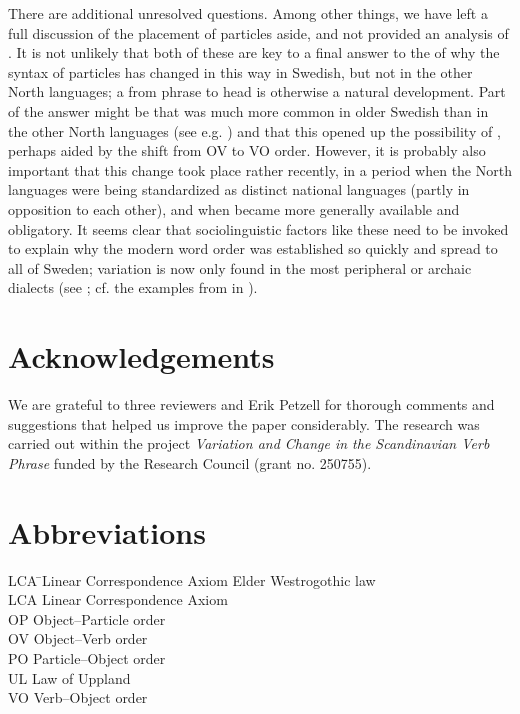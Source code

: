 \documentclass[output=paper]{langscibook}
\begin{document}
There are additional unresolved questions. Among other things, we have left a full discussion of the  placement of particles aside, and not provided an analysis of  . It is not unlikely that both of these are key to a final answer to the  of why the syntax of particles has changed in this way in Swedish, but not in the other North  languages; a  from phrase to head is otherwise a natural development. Part of the answer might be that   was much more common in older Swedish than in the other North  languages (see e.g. \citealt{Ljunggren1932}) and that this opened up the possibility of , perhaps aided by the shift from OV to VO order. However, it is probably also important that this change took place rather recently, in a period when the North  languages were being standardized as distinct national languages (partly in opposition to each other), and when  became more generally available and obligatory. It seems clear that sociolinguistic factors like these need to be invoked to explain why the modern word order was established so quickly and spread to all of Sweden; variation is now only found in the most peripheral or archaic dialects (see \citealt{Lundquist2014Active}; cf. the examples from  in ).


\section*{Acknowledgements}

We are grateful to three reviewers and Erik Petzell for thorough comments and suggestions that helped us improve the paper considerably. The research was carried out within the project \textit{Variation and Change in the Scandinavian Verb Phrase} funded by the  Research Council (grant no. 250755).


\section*{Abbreviations}
\begin{multicols}{2}
\begin{tabbing}
LCA \hspace{1ex}\=  Linear Correspondence Axiom\kill
{} \>  Elder Westrogothic law\\
LCA \>  Linear Correspondence Axiom\\
OP  \> Object--Particle order\\
OV  \> Object–Verb order\\
PO  \> Particle–Object order\\
UL  \> Law of Uppland\\
VO  \> Verb–Object order\\
\end{tabbing}
\end{multicols}
\end{document}
